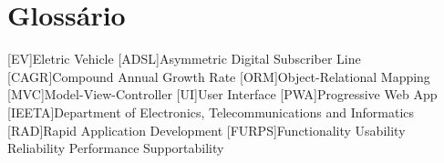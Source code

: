 \chapter{Glossário}

\footnotesize
\SingleSpacing

\begin{multicols}{2}
\begin{acronym}[AAAAAA]

	[EV]{Eletric Vehicle}
	[ADSL]{Asymmetric Digital Subscriber Line}
	[CAGR]{Compound Annual Growth Rate}
	[ORM]{Object-Relational Mapping}
	[MVC]{Model-View-Controller}
	[UI]{User Interface}
	[PWA]{Progressive Web App}
	[IEETA]{Department of Electronics, Telecommunications and Informatics}
	[RAD]{Rapid Application Development}
	[FURPS]{Functionality Usability Reliability Performance Supportability}
	

\end{acronym}
\end{multicols}

